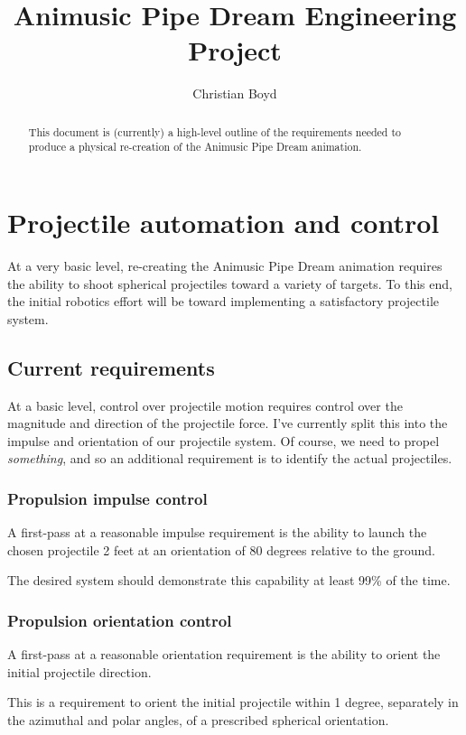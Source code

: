 \documentclass{article}
\begin{document}
\title{Animusic Pipe Dream Engineering Project}
\author{Christian Boyd}
\maketitle

\begin{abstract}
    This document is (currently) a high-level outline of the requirements needed to 
    produce a physical re-creation of the Animusic Pipe Dream animation.
\end{abstract}

\section{Projectile automation and control}
At a very basic level, re-creating the Animusic Pipe Dream animation requires the ability
to shoot spherical projectiles toward a variety of targets.  To this end, the initial
robotics effort will be toward implementing a satisfactory projectile system.

\subsection{Current requirements}

At a basic level, control over projectile motion requires control over the magnitude and
direction of the projectile force.  I've currently split this into the impulse and
orientation of our projectile system.  Of course, we need to propel {\it something}, and
so an additional requirement is to identify the actual projectiles.

\subsubsection{Propulsion impulse control}
A first-pass at a reasonable impulse requirement is the ability to launch the chosen
projectile 2 feet at an orientation of 80 degrees relative to the ground.

The desired system should demonstrate this capability at least 99\% of the time.

\subsubsection{Propulsion orientation control}
A first-pass at a reasonable orientation requirement is the ability to orient the initial
projectile direction.

This is a requirement to orient the initial projectile within 1 degree, separately in the
azimuthal and polar angles, of a prescribed spherical orientation.
\end{document}
